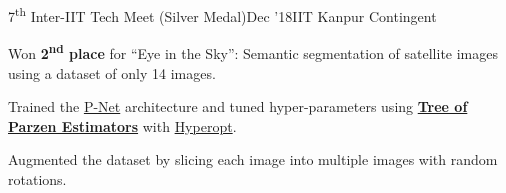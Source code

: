 \begin{itemize}
{    \item \begin{project}{7\textsuperscript{th} Inter-IIT Tech Meet (Silver Medal)}{Dec '18}{IIT Kanpur Contingent}
        \item Won \textbf{2\textsuperscript{nd} place} for ``Eye in the Sky'': Semantic segmentation of satellite images using a dataset of only 14 images.
        \item Trained the \href{http://discovery.ucl.ac.uk/10032237/7/David_08270673.pdf}{P-Net} architecture and tuned hyper-parameters using \href{https://papers.nips.cc/paper/4443-algorithms-for-hyper-parameter-optimization}{\textbf{Tree of Parzen Estimators}} with \href{https://hyperopt.github.io/hyperopt/}{Hyperopt}.
        \item Augmented the dataset by slicing each image into multiple images with random rotations.
    \end{project}
}

\item {}%
\item {}%

\end{itemize}
